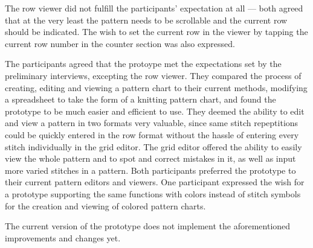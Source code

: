 The row viewer did not fulfill the participants' expectation at all --- both agreed that at the very least the pattern needs to be scrollable and the current row should be indicated. The wish to set the current row in the viewer by tapping the current row number in the counter section was also expressed.

The participants agreed that the protoype met the expectations set by the preliminary interviews, excepting the row viewer. They compared the process of creating, editing and viewing a pattern chart to their current methods, modifying a spreadsheet to take the form of a knitting pattern chart, and found the prototype to be much easier and efficient to use. They deemed the ability to edit and view a pattern in two formats very valuable, since same stitch repeptitions could be quickly entered in the row format without the hassle of entering every stitch individually in the grid editor. The grid editor offered the ability to easily view the whole pattern and to spot and correct mistakes in it, as well as input more varied stitches in a pattern. Both participants preferred the prototype to their current pattern editors and viewers. One participant expressed the wish for a prototype supporting the same functions with colors instead of stitch symbols for the creation and viewing of colored pattern charts.

The current version of the prototype does not implement the aforementioned improvements and changes yet.